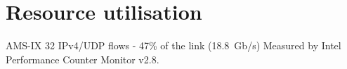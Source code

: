 









\section{Resource utilisation}
AMS-IX 32 IPv4/UDP flows - 47\% of the link (18.8~Gb/s)
Measured by Intel Performance Counter Monitor v2.8.

